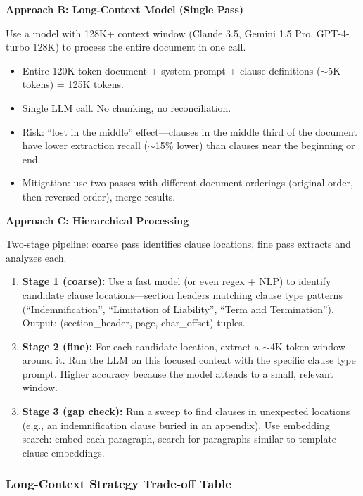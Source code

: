 \textbf{Approach B: Long-Context Model (Single Pass)}

Use a model with 128K+ context window (Claude 3.5, Gemini 1.5 Pro, GPT-4-turbo 128K) to process the entire document in one call.

\begin{itemize}
  \item Entire 120K-token document + system prompt + clause definitions ($\sim$5K tokens) = 125K tokens.
  \item Single LLM call. No chunking, no reconciliation.
  \item Risk: ``lost in the middle'' effect---clauses in the middle third of the document have lower extraction recall ($\sim$15\% lower) than clauses near the beginning or end.
  \item Mitigation: use two passes with different document orderings (original order, then reversed order), merge results.
\end{itemize}

\textbf{Approach C: Hierarchical Processing}

Two-stage pipeline: coarse pass identifies clause locations, fine pass extracts and analyzes each.

\begin{enumerate}
  \item \textbf{Stage 1 (coarse):} Use a fast model (or even regex + NLP) to identify candidate clause locations---section headers matching clause type patterns (``Indemnification'', ``Limitation of Liability'', ``Term and Termination''). Output: (section\_header, page, char\_offset) tuples.
  \item \textbf{Stage 2 (fine):} For each candidate location, extract a $\sim$4K token window around it. Run the LLM on this focused context with the specific clause type prompt. Higher accuracy because the model attends to a small, relevant window.
  \item \textbf{Stage 3 (gap check):} Run a sweep to find clauses in unexpected locations (e.g., an indemnification clause buried in an appendix). Use embedding search: embed each paragraph, search for paragraphs similar to template clause embeddings.
\end{enumerate}

\subsubsection*{Long-Context Strategy Trade-off Table}

